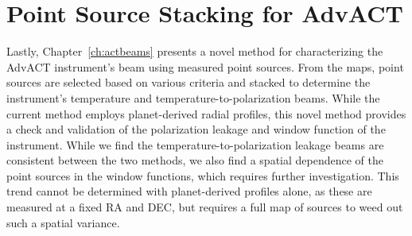 \section{Point Source Stacking for AdvACT}
Lastly, Chapter~\ref{ch:actbeams} presents a novel method for characterizing the AdvACT instrument's beam using measured point sources.  From the maps, point sources are selected based on various criteria and stacked to determine the instrument's temperature and temperature-to-polarization beams.  While the current method employs planet-derived radial profiles, this novel method provides a check and validation of the polarization leakage and window function of the instrument.  While we find the temperature-to-polarization leakage beams are consistent between the two methods, we also find a spatial dependence of the point sources in the window functions, which requires further investigation. This trend cannot be determined with planet-derived profiles alone, as these are measured at a fixed RA and DEC, but requires a full map of sources to weed out such a spatial variance.